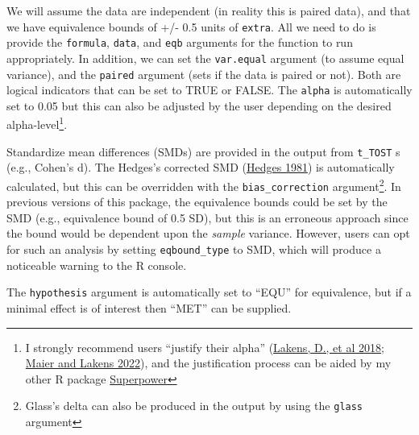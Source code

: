 \documentclass[
]{interact}
\newenvironment{Shaded}{\begin{snugshade}}{\end{snugshade}}
\newcommand{\AttributeTok}[1]{\textcolor[rgb]{0.40,0.45,0.13}{#1}}
\newcommand{\CommentTok}[1]{\textcolor[rgb]{0.37,0.37,0.37}{#1}}
\newcommand{\DecValTok}[1]{\textcolor[rgb]{0.68,0.00,0.00}{#1}}
\newcommand{\FunctionTok}[1]{\textcolor[rgb]{0.28,0.35,0.67}{#1}}
\newcommand{\NormalTok}[1]{\textcolor[rgb]{0.00,0.23,0.31}{#1}}
\newcommand{\OtherTok}[1]{\textcolor[rgb]{0.00,0.23,0.31}{#1}}
\newcommand{\SpecialCharTok}[1]{\textcolor[rgb]{0.37,0.37,0.37}{#1}}
\newcommand{\StringTok}[1]{\textcolor[rgb]{0.13,0.47,0.30}{#1}}
\begin{document}
We will assume the data are independent (in reality this is paired
data), and that we have equivalence bounds of +/- 0.5 units of
\texttt{extra}. All we need to do is provide the \texttt{formula},
\texttt{data}, and \texttt{eqb} arguments for the function to run
appropriately. In addition, we can set the \texttt{var.equal} argument
(to assume equal variance), and the \texttt{paired} argument (sets if
the data is paired or not). Both are logical indicators that can be set
to TRUE or FALSE. The \texttt{alpha} is automatically set to 0.05 but
this can also be adjusted by the user depending on the desired
alpha-level\footnote{I strongly recommend users ``justify their alpha''
  (\protect\hyperlink{ref-jya1}{Lakens, D., et al 2018};
  \protect\hyperlink{ref-jya2}{Maier and Lakens 2022}), and the
  justification process can be aided by my other R package
  \href{https://aaroncaldwell.us/Superpower}{Superpower}}.

Standardize mean differences (SMDs) are provided in the output from
\texttt{t\_TOST} s (e.g., Cohen's d). The Hedges's corrected SMD
(\protect\hyperlink{ref-hedges_bias}{Hedges 1981}) is automatically
calculated, but this can be overridden with the
\texttt{bias\_correction} argument\footnote{Glass's delta can also be
  produced in the output by using the \texttt{glass} argument}. In
previous versions of this package, the equivalence bounds could be set
by the SMD (e.g., equivalence bound of 0.5 SD), but this is an erroneous
approach since the bound would be dependent upon the \emph{sample}
variance. However, users can opt for such an analysis by setting
\texttt{eqbound\_type} to SMD, which will produce a noticeable warning
to the R console.

The \texttt{hypothesis} argument is automatically set to ``EQU'' for
equivalence, but if a minimal effect is of interest then ``MET'' can be
supplied.

\begin{Shaded}
\end{Shaded}
\end{document}
